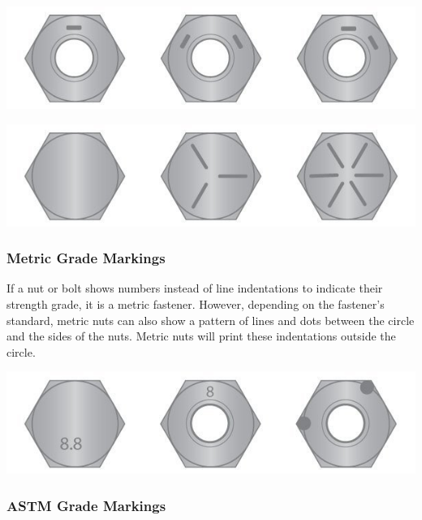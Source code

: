 \documentclass[12pt, a4paper]{article}
\begin{document}
		\hypertarget{in8paa}{}
		\includegraphics{Introduction to Nut and Bolt Sizes_files/6307b8d27e9fd904635918.jpg}
		
		\hypertarget{ivmctl}{}
		\includegraphics{Introduction to Nut and Bolt Sizes_files/6307b8fa19b82843920771.jpg}
		
		\hypertarget{i7ab7i}{%
			\subsubsection{Metric Grade Markings}\label{i7ab7i}}
		
		\hypertarget{i3f3hj}{}
		If a nut or bolt shows numbers instead of line indentations to indicate
		their strength grade, it is a metric fastener. However, depending on the
		fastener's standard, metric nuts can also show a pattern of lines and
		dots between the circle and the sides of the nuts. Metric nuts will
		print these indentations outside the circle.
		
		\hypertarget{i6g3ac}{}
		\includegraphics{Introduction to Nut and Bolt Sizes_files/6307b947273e3119595489.jpg}
		
		\hypertarget{iawz2f}{}
		
		\hypertarget{in2ujb}{%
			\subsubsection{ASTM Grade Markings}\label{in2ujb}}
		
\end{document}
